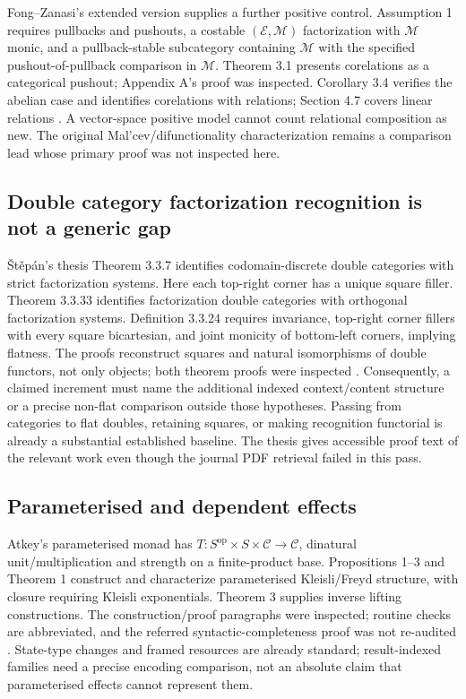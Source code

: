 \documentclass[11pt,a4paper]{article}
\newcommand{\op}{\mathrm{op}}
\newcommand{\E}{\mathcal E}
\newcommand{\C}{\mathcal C}
\begin{document}
Fong--Zanasi's extended version supplies a further positive control. Assumption
1 requires pullbacks and pushouts, a costable \((\E,\mathcal M)\) factorization
with \(\mathcal M\) monic, and a pullback-stable subcategory containing
\(\mathcal M\) with the specified pushout-of-pullback comparison in
\(\mathcal M\). Theorem 3.1 presents corelations as a categorical pushout;
Appendix A's proof was inspected. Corollary 3.4 verifies the abelian case and
identifies corelations with relations; Section 4.7 covers linear relations
\cite{FZ}. A vector-space positive model cannot count relational composition
as new. The original Mal'cev/difunctionality characterization remains a
comparison lead whose primary proof was not inspected here.

\subsection{Double category factorization recognition is not a generic gap}

\v{S}t\v{e}p\'an's thesis Theorem 3.3.7 identifies codomain-discrete double
categories with strict factorization systems. Here each top-right corner has a
unique square filler. Theorem 3.3.33 identifies factorization double categories
with orthogonal factorization systems. Definition 3.3.24 requires invariance,
top-right corner fillers with every square bicartesian, and joint monicity of
bottom-left corners, implying flatness. The proofs reconstruct squares and
natural isomorphisms of double functors, not only objects; both theorem proofs
were inspected \cite{Stepan}. Consequently, a claimed increment must name the
additional indexed context/content structure or a precise non-flat comparison
outside those hypotheses. Passing from categories to flat doubles, retaining
squares, or making recognition functorial is already a substantial established
baseline. The thesis gives accessible proof text of the relevant work even
though the journal PDF retrieval failed in this pass.

\subsection{Parameterised and dependent effects}

Atkey's parameterised monad has
\(T:S^{\op}\times S\times\C\to\C\), dinatural unit/multiplication and strength
on a finite-product base. Propositions 1--3 and Theorem 1 construct and
characterize parameterised Kleisli/Freyd structure, with closure requiring
Kleisli exponentials. Theorem 3 supplies inverse lifting constructions.
The construction/proof paragraphs were inspected; routine checks are abbreviated,
and the referred syntactic-completeness proof was not re-audited
\cite{Atkey}. State-type changes and framed resources are already standard;
result-indexed families need a precise encoding comparison, not an absolute
claim that parameterised effects cannot represent them.
\end{document}
